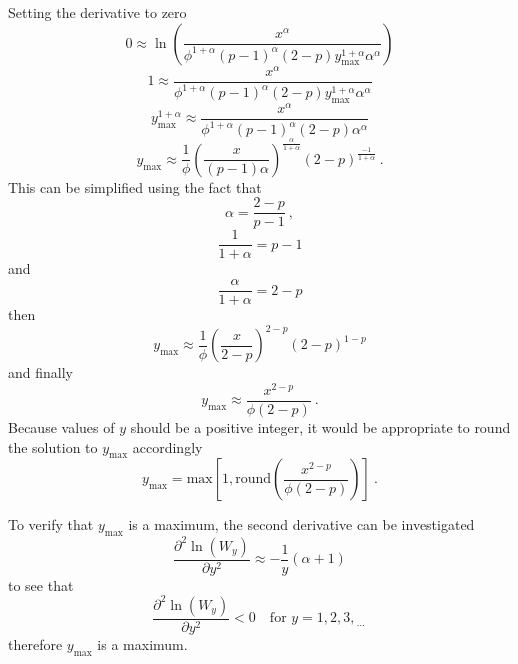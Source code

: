 \documentclass[12pt, a4paper]{memoir}
\newcommand{\dotdotdot}{_{\phantom{.}\cdots}}
\begin{document}
Setting the derivative to zero
\begin{equation*}
	0 \approx \ln\left(
		\frac{
			x^\alpha
		}
		{
			\phi^{1+\alpha}(p-1)^\alpha(2-p)y_{\text{max}}^{1+\alpha}\alpha^\alpha
		}
	\right)
\end{equation*}
\begin{equation*}
	1 \approx 
	\frac{x^\alpha}{\phi^{1+\alpha}(p-1)^\alpha(2-p)y_{\text{max}}^{1+\alpha}\alpha^\alpha}
\end{equation*}
\begin{equation*}
	y_{\text{max}}^{1+\alpha} \approx 
	\frac{x^\alpha}{\phi^{1+\alpha}(p-1)^\alpha(2-p)\alpha^\alpha}
\end{equation*}
\begin{equation*}
	y_{\text{max}} \approx 
	\frac{1}{\phi}
	\left(
		\frac{x}{(p-1)\alpha}
	\right)^{\frac{\alpha}{1+\alpha}}
	(2-p)^{\frac{-1}{1+\alpha}}
	\ .
\end{equation*}
This can be simplified using the fact that 
\begin{equation*}
	\alpha=\frac{2-p}{p-1}
	\ ,
\end{equation*}
\begin{equation*}
	\frac{1}{1+\alpha} = p-1
\end{equation*}
and
\begin{equation*}
	\frac{\alpha}{1+\alpha} = 2-p
\end{equation*}
then
\begin{equation*}
	y_{\text{max}} \approx 
	\frac{1}{\phi}
	\left(
		\frac{x}{2-p}
	\right)^{2-p}
	(2-p)^{1-p}
\end{equation*}
and finally
\begin{equation}
	y_{\text{max}} \approx \frac{x^{2-p}}{\phi(2-p)}
	\ .
\end{equation}
Because values of $y$ should be a positive integer, it would be appropriate to round the solution to $y_\text{max}$ accordingly
\begin{equation}
	y_{\text{max}} = \text{max}\left[
		1,\text{round}\left(\frac{x^{2-p}}{\phi(2-p)}\right)
	\right]
	\ .
\end{equation}

To verify that $y_\text{max}$ is a maximum, the second derivative can be investigated
\begin{equation}
	\frac{\partial^2\ln(W_y)}{\partial y^2}
	\approx
	-\frac{1}{y}(\alpha+1)
\end{equation}
to see that
\begin{equation}
	\frac{\partial^2\ln(W_y)}{\partial y^2} < 0 \quad \text{for }y=1,2,3,\dotdotdot
\end{equation}
therefore $y_\text{max}$ is a maximum.
\end{document}
